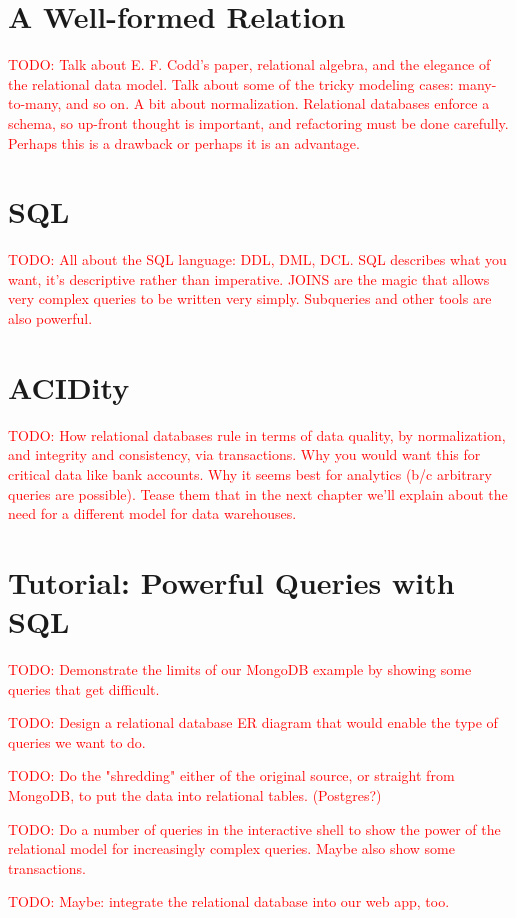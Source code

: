 \documentclass[11pt]{book}
\newcommand{\todo}[1]{\textcolor{red}{TODO: #1}} %
\begin{document}
\section{A Well-formed Relation}
\todo{Talk about E. F. Codd's paper, relational algebra, and the elegance of the relational data model.  Talk about some of the tricky modeling cases: many-to-many, and so on.  A bit about normalization.  Relational databases enforce a schema, so up-front thought is important, and refactoring must be done carefully.  Perhaps this is a drawback or perhaps it is an advantage.}

\section{SQL}
\todo{All about the SQL language: DDL, DML, DCL.  SQL describes what you want, it's descriptive rather than imperative.  JOINS are the magic that allows very complex queries to be written very simply.  Subqueries and other tools are also powerful.}

\section{ACIDity}
\todo{How relational databases rule in terms of data quality, by normalization, and integrity and consistency, via transactions.  Why you would want this for critical data like bank accounts.  Why it seems best for analytics (b/c arbitrary queries are possible).  Tease them that in the next chapter we'll explain about the need for a different model for data warehouses.}

\section{Tutorial: Powerful Queries with SQL}

\todo{Demonstrate the limits of our MongoDB example by showing some queries that get difficult.}

\todo{Design a relational database ER diagram that would enable the type of queries we want to do.}

\todo{Do the "shredding" either of the original source, or straight from MongoDB, to put the data into relational tables. (Postgres?)}

\todo{Do a number of queries in the interactive shell to show the power of the relational model for increasingly complex queries.  Maybe also show some transactions.}

\todo{Maybe: integrate the relational database into our web app, too.}
\end{document}
